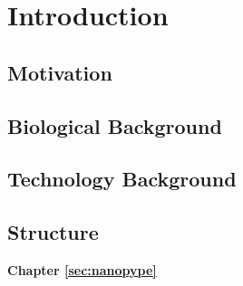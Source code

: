 \chapter{Introduction}
\label{sec:intro}



\section{Motivation}
\label{sec:intro:motivation}

\section{Biological Background}
\label{sec:intro:bio}

\section{Technology Background}
\label{sec:intro:sequencing}

\section{Structure}
\label{sec:intro:structure}


\textbf{Chapter \ref{sec:nanopype}} \\[0.2em]
\blindtext

